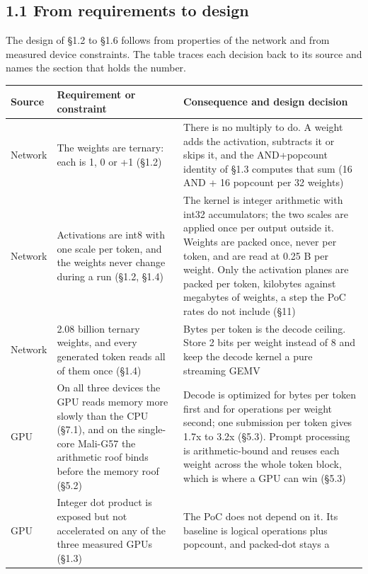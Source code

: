 \documentclass[
  10pt,
]{article}
\newcounter{none} %
\begin{document}
\subsection{1.1 From requirements to design}\label{from-requirements-to-design}

The design of \S{}1.2 to \S{}1.6 follows from properties of the network
and from measured device constraints. The table traces each decision
back to its source and names the section that holds the number.

{\def\LTcaptype{none} %
\begin{longtable}[]{@{}p{2.2cm}p{5.9cm}p{7.9cm}@{}}
\toprule\noalign{}
Source & Requirement or constraint & Consequence and design decision \\
\midrule\noalign{}
\endhead%
\bottomrule\noalign{}
\endlastfoot%
Network & The weights are ternary: each is \textminus{}1, 0 or +1
(\S{}1.2) & There is no multiply to do. A weight adds the activation,
subtracts it or skips it, and the AND+popcount identity of \S{}1.3
computes that sum (16 AND + 16 popcount per 32 weights) \\
Network & Activations are int8 with one scale per token, and the weights
never change during a run (\S{}1.2, \S{}1.4) & The kernel is integer
arithmetic with int32 accumulators; the two scales are applied once per
output outside it. Weights are packed once, never per token, and are
read at 0.25 B per weight. Only the activation planes are packed per
token, kilobytes against megabytes of weights, a step the PoC rates do
not include (\S{}11) \\
Network & 2.08 billion ternary weights, and every generated token reads
all of them once (\S{}1.4) & Bytes per token is the decode ceiling.
Store 2 bits per weight instead of 8 and keep the decode kernel a pure
streaming GEMV \\
GPU & On all three devices the GPU reads memory more slowly than the CPU
(\S{}7.1), and on the single-core Mali-G57 the arithmetic roof binds
before the memory roof (\S{}5.2) & Decode is optimized for bytes per
token first and for operations per weight second; one submission per
token gives 1.7x to 3.2x (\S{}5.3). Prompt processing is
arithmetic-bound and reuses each weight across the whole token block,
which is where a GPU can win (\S{}5.3) \\
GPU & Integer dot product is exposed but not accelerated on any of the
three measured GPUs (\S{}1.3) & The PoC does not depend on it. Its
baseline is logical operations plus popcount, and packed-dot stays a

\end{longtable}}
\end{document}
